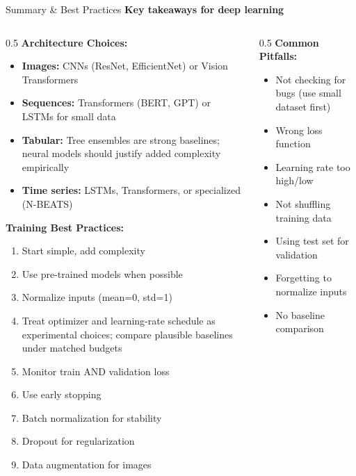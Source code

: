 \begin{frame}{Summary \& Best Practices}
\textbf{Key takeaways for deep learning}

\begin{columns}
\begin{column}{0.5\textwidth}
\textbf{Architecture Choices:}

\begin{itemize}
\item \textbf{Images:} CNNs (ResNet, EfficientNet) or Vision Transformers
\item \textbf{Sequences:} Transformers (BERT, GPT) or LSTMs for small data
\item \textbf{Tabular:} Tree ensembles are strong baselines; neural models should justify added complexity empirically
\item \textbf{Time series:} LSTMs, Transformers, or specialized (N-BEATS)
\end{itemize}

\vspace{0.3cm}

\textbf{Training Best Practices:}

\begin{enumerate}
\item Start simple, add complexity
\item Use pre-trained models when possible
\item Normalize inputs (mean=0, std=1)
\item Treat optimizer and learning-rate schedule as experimental choices; compare plausible baselines under matched budgets
\item Monitor train AND validation loss
\item Use early stopping
\item Batch normalization for stability
\item Dropout for regularization
\item Data augmentation for images
\end{enumerate}
\end{column}

\begin{column}{0.5\textwidth}
\textbf{Common Pitfalls:}

\begin{itemize}
\item[$\times$] Not checking for bugs (use small dataset first)
\item[$\times$] Wrong loss function
\item[$\times$] Learning rate too high/low
\item[$\times$] Not shuffling training data
\item[$\times$] Using test set for validation
\item[$\times$] Forgetting to normalize inputs
\item[$\times$] No baseline comparison
\end{itemize}


\end{column}
\end{columns}
\end{frame}
